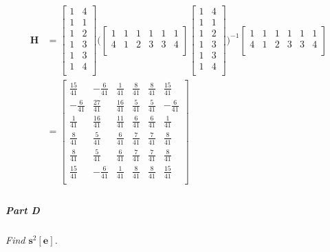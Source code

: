\documentclass[12pt, letterpaper]{article}
\begin{document}
\begin{align*}
\textbf{H} &= \begin{bmatrix}
 1 & 4 \\
 1 & 1 \\
 1 & 2 \\
 1 & 3 \\
 1 & 3 \\
 1 & 4 \\
\end{bmatrix}
\Bigg(\begin{bmatrix}
 1 & 1 & 1 & 1 & 1 & 1 \\
 4 & 1 & 2 & 3 & 3 & 4 \\
\end{bmatrix}
\begin{bmatrix}
 1 & 4 \\
 1 & 1 \\
 1 & 2 \\
 1 & 3 \\
 1 & 3 \\
 1 & 4 \\
\end{bmatrix}
\Bigg)^{-1}
\begin{bmatrix}
 1 & 1 & 1 & 1 & 1 & 1 \\
 4 & 1 & 2 & 3 & 3 & 4 \\
\end{bmatrix} \\
&= \begin{bmatrix}
 \frac{15}{41} & -\frac{6}{41} & \frac{1}{41} & \frac{8}{41} & \frac{8}{41} & \frac{15}{41} \\
 -\frac{6}{41} & \frac{27}{41} & \frac{16}{41} & \frac{5}{41} & \frac{5}{41} & -\frac{6}{41} \\
 \frac{1}{41} & \frac{16}{41} & \frac{11}{41} & \frac{6}{41} & \frac{6}{41} & \frac{1}{41} \\
 \frac{8}{41} & \frac{5}{41} & \frac{6}{41} & \frac{7}{41} & \frac{7}{41} & \frac{8}{41} \\
 \frac{8}{41} & \frac{5}{41} & \frac{6}{41} & \frac{7}{41} & \frac{7}{41} & \frac{8}{41} \\
 \frac{15}{41} & -\frac{6}{41} & \frac{1}{41} & \frac{8}{41} & \frac{8}{41} & \frac{15}{41} \\
\end{bmatrix} \\
\end{align*}

\subparagraph{Part D}
\textit{Find $\textbf{s}^{2}[\textbf{e}]$.}\\
\end{document}
